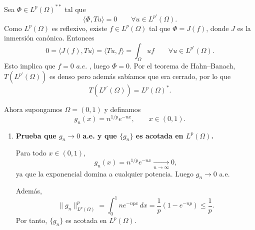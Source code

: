 \documentclass[12pt]{article}
\begin{document}
\begin{ejercicio}[4 puntos]
\begin{enumerate}[label=\alph*)]
        Sea
        $\Phi\in L^p(\Omega)^{\ast\ast}$ tal que
        \begin{equation*}
        \langle \Phi, Tu\rangle = 0
        \qquad \forall u\in L^{p'}(\Omega).
        \end{equation*}
        Como $L^p(\Omega)$ es reflexivo, existe $f\in L^p(\Omega)$ tal que
        $\Phi = J(f)$, donde $J$ es la inmersión canónica. Entonces
        \begin{equation*}
        0
        =
        \langle J(f),Tu\rangle
        =
        \langle Tu,f\rangle
        =
        \int_\Omega u f
        \qquad \forall u\in L^{p'}(\Omega).
        \end{equation*}
        Esto implica que $f=0$ $a.e.$ , luego $\Phi=0$.
        Por el teorema de Hahn--Banach, $T(L^{p'}(\Omega))$ es denso pero además sabíamos que era cerrado,
        por lo que
        \begin{equation*}
        T(L^{p'}(\Omega))=L^p(\Omega)^\ast.
        \end{equation*}
        
        \end{enumerate}
        
        \vspace{2mm}
        
        Ahora supongamos $\Omega=(0,1)$ y definamos
        \begin{equation*}
        g_n(x)=n^{1/p}e^{-nx}, \qquad x\in(0,1).
        \end{equation*}
        
        \begin{enumerate}[label=\alph*),resume]
        
        \item \textbf{Prueba que $g_n\to 0$ a.e. y que $\{g_n\}$ es acotada en $L^p(\Omega)$.}
        
        Para todo $x\in(0,1)$,
        \begin{equation*}
        g_n(x)=n^{1/p}e^{-nx}\xrightarrow[n\to\infty]{}0,
        \end{equation*}
        ya que la exponencial domina a cualquier potencia. Luego $g_n\to 0$ a.e.
        
        Además,
        \begin{equation*}
        \|g_n\|_{L^p(\Omega)}^p
        =
        \int_0^1 n e^{-npx}\,dx
        =
        \frac{1}{p}\left(1-e^{-np}\right)
        \le
        \frac{1}{p}.
        \end{equation*}
        Por tanto, $\{g_n\}$ es acotada en $L^p(\Omega)$.
        

\end{enumerate}
\end{ejercicio}
\end{document}
